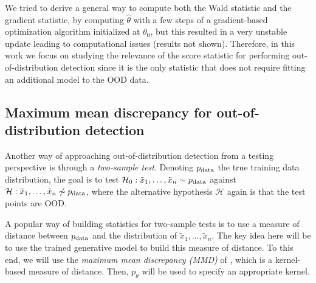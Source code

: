 {%
%
We tried to derive a general way to compute both the Wald statistic and the gradient statistic, by computing $ \hat{\theta}$ with a few steps of a gradient-based optimization algorithm initialized at $ \theta_0$, but this resulted in a very unstable update leading to computational issues (results not shown). Therefore, in this work we focus on studying the relevance of the score statistic for performing out-of-distribution detection since it is the only statistic that does not require fitting an additional model to the OOD data.


\subsection{Maximum mean discrepancy for out-of-distribution detection}\label{sec_modelagnostic:MMD}
Another way of approaching out-of-distribution detection from a testing perspective is through a \emph{two-sample test}. Denoting $p_\textup{data}$ the true training data distribution, the goal is to test $\mathcal{H}_0: \tilde{x}_1,\ldots,\tilde{x}_n \sim p_\textup{data}$ against $\mathcal{H}: \tilde{x}_1,\ldots,\tilde{x}_n \not\sim p_\textup{data}$, where the alternative hypothesis $\mathcal{H}$ again is that the test points are OOD.

A popular way of building statistics for two-sample tests is to use a measure of distance between $p_\textup{data}$ and the distribution of $\tilde{x}_1,\ldots,\tilde{x}_n$. The key idea here will be to use the trained generative model to build this measure of distance. To this end, we will use the \emph{maximum mean discrepancy (MMD)} of \textcite{gretton_kernel_2012}, which is a kernel-based measure of distance. Then, $p_\theta$ will be used to specify an appropriate kernel.

}
